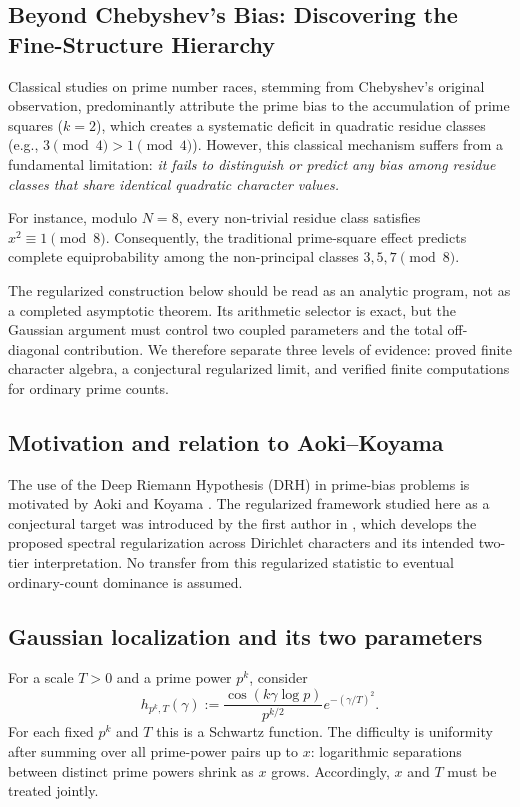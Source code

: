 \documentclass[12pt,reqno]{amsart}
\theoremstyle{definition}
\theoremstyle{remark}
\numberwithin{equation}{section}
\begin{document}
\subsection{Beyond Chebyshev's Bias: Discovering the Fine-Structure Hierarchy}

Classical studies on prime number races, stemming from Chebyshev's original observation, predominantly attribute the prime bias to the accumulation of prime squares ($k=2$), which creates a systematic deficit in quadratic residue classes (e.g., $3 \pmod 4 > 1 \pmod 4$). However, this classical mechanism suffers from a fundamental limitation: \emph{it fails to distinguish or predict any bias among residue classes that share identical quadratic character values.}

For instance, modulo $N=8$, every non-trivial residue class satisfies $x^2 \equiv 1 \pmod 8$. Consequently, the traditional prime-square effect predicts complete equiprobability among the non-principal classes $3, 5, 7 \pmod 8$. 


The regularized construction below should be read as an analytic program,
not as a completed asymptotic theorem.  Its arithmetic selector is exact, but
the Gaussian argument must control two coupled parameters and the total
off-diagonal contribution.  We therefore separate three levels of evidence:
proved finite character algebra, a conjectural regularized limit, and verified
finite computations for ordinary prime counts.

\subsection{Motivation and relation to Aoki--Koyama}

The use of the Deep Riemann Hypothesis (DRH) in prime-bias problems is
motivated by Aoki and Koyama \cite{AK23}.  The regularized framework studied
here as a conjectural target was introduced by the first author in
\cite{K26}, which develops the proposed spectral regularization across
Dirichlet characters and its intended two-tier interpretation.  No transfer from this
regularized statistic to eventual ordinary-count dominance is assumed.

\subsection{Gaussian localization and its two parameters}

For a scale $T>0$ and a prime power $p^k$, consider
\begin{equation}
h_{p^k,T}(\gamma):=
 \frac{\cos(k\gamma\log p)}{p^{k/2}}
 e^{-(\gamma/T)^2}.
\end{equation}
For each fixed $p^k$ and $T$ this is a Schwartz function.  The difficulty is
uniformity after summing over all prime-power pairs up to $x$: logarithmic
separations between distinct prime powers shrink as $x$ grows.  Accordingly,
$x$ and $T$ must be treated jointly.
\end{document}
